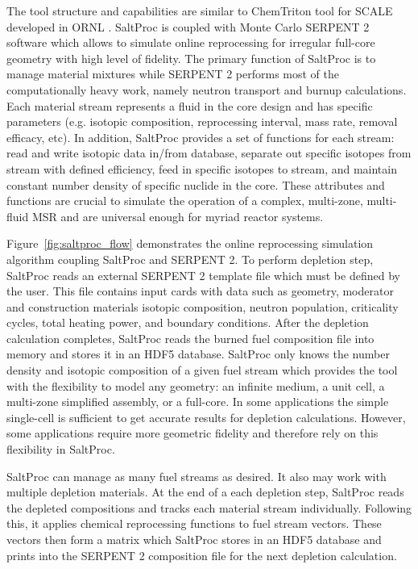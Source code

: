 The tool structure and capabilities are similar to ChemTriton tool for SCALE developed in \gls{ORNL} \cite{powers_new_2013}. SaltProc is coupled with Monte Carlo SERPENT 2 software which allows to simulate online reprocessing for irregular full-core geometry with high level of fidelity.  The primary function of SaltProc is to manage material mixtures while SERPENT 2 performs most of the computationally heavy work, namely neutron transport and burnup calculations. Each material stream represents a fluid in the core design and has specific parameters (e.g. isotopic composition, reprocessing interval, mass rate, removal efficacy, etc). In addition, SaltProc provides a set of functions for each stream: read and write isotopic data in/from database, separate out specific isotopes from stream with defined efficiency, feed in specific isotopes to stream, and maintain constant number density of specific nuclide in the core. These attributes and functions are crucial to simulate the operation of a complex, multi-zone, multi-fluid \gls{MSR} and are universal enough for myriad reactor systems.

Figure~\ref{fig:saltproc_flow} demonstrates the  online reprocessing simulation algorithm coupling SaltProc and SERPENT 2. To perform depletion step, SaltProc reads an external SERPENT 2 template file which must be defined by the user. This file contains input cards with data such as geometry, moderator and construction materials isotopic composition, neutron population, criticality cycles, total heating power, and boundary conditions. After the depletion calculation completes, SaltProc reads the burned fuel composition file into memory and stores it in an HDF5 database. SaltProc only knows the number density and isotopic composition of a given fuel stream which provides the tool with the flexibility to model any geometry: an infinite medium, a unit cell, a multi-zone simplified assembly, or a full-core. In some applications the simple single-cell is sufficient to get accurate results for depletion calculations. However, some applications require more geometric fidelity and therefore rely on this flexibility in SaltProc.

SaltProc can manage as many fuel streams as desired. It also may work with multiple depletion materials. At the end of a each depletion step, SaltProc reads the depleted compositions and tracks each material stream individually. Following this, it applies chemical reprocessing functions to fuel stream vectors. These vectors then form a matrix which SaltProc stores in an HDF5 database and prints into the SERPENT 2 composition file for the next depletion calculation.

